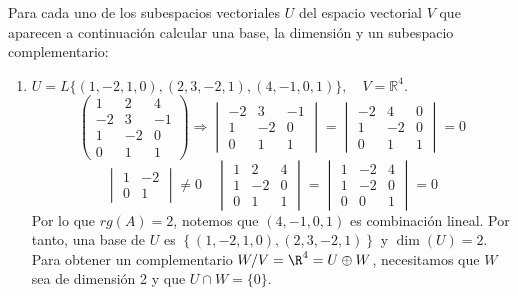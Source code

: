 \begin{ejercicio}Para cada uno de los subespacios vectoriales \( U \) del espacio vectorial \( V \) que aparecen a continuación calcular una base, la dimensión y un subespacio complementario:
	\begin{enumerate}[label=\alph*)]
		\item \( U = L\{ (1, -2, 1, 0), (2, 3, -2, 1), (4, -1, 0, 1) \}, \quad V = \mathbb{R}^4 \).
		      \begin{equation*}
			      \begin{pmatrix}
				      1  & 2  & 4  \\
				      -2 & 3  & -1 \\
				      1  & -2 & 0  \\
				      0  & 1  & 1
			      \end{pmatrix} \Rightarrow \begin{vmatrix}
				      -2 & 3  & -1 \\
				      1  & -2 & 0  \\
				      0  & 1  & 1
			      \end{vmatrix} = \begin{vmatrix}
				      -2 & 4  & 0 \\
				      1  & -2 & 0 \\
				      0  & 1  & 1
			      \end{vmatrix} = 0
		      \end{equation*}
		      \begin{equation*}
			      \begin{vmatrix}
				      1 & -2 \\
				      0 & 1
			      \end{vmatrix} \neq 0 \quad \begin{vmatrix}
				      1 & 2  & 4 \\
				      1 & -2 & 0 \\
				      0 & 1  & 1
			      \end{vmatrix} = \begin{vmatrix}
				      1 & -2 & 4 \\
				      1 & -2 & 0 \\
				      0 & 0  & 1
			      \end{vmatrix} = 0
		      \end{equation*}
		      Por lo que $rg(A) = 2$, notemos que $(4,-1, 0, 1)$ es combinación lineal.
		      Por tanto, una base de $U$ es $\left\{ (1, -2, 1, 0), (2, 3, -2, 1) \right\}$ y $\dim(U) = 2$.
		      Para obtener un complementario $W / V = \R^4 = U \oplus W$, necesitamos que $W$ sea de dimensión 2 y que $U \cap W = \{0\}$.

\end{enumerate}
\end{ejercicio}
